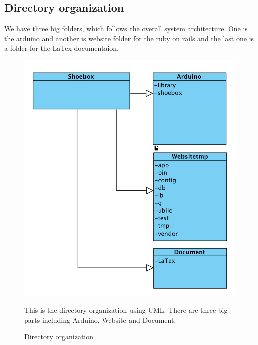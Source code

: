 \documentclass[conference]{IEEEtran}
\begin{document}
\subsection{Directory organization}
We have three big folders, which follows the overall system architecture. One is the arduino and another is website folder for the ruby on rails and the last one is a folder for the LaTex documentaion.
\begin{figure}[H]
\begin{center}
    \includegraphics[scale=0.65]{directory1}
   \caption{Directory organization}\label{fig:label}
   This is the directory organization using UML. There are three big parts including Arduino, Website and Document.
\end{center}
\end{figure}

\end{document}
